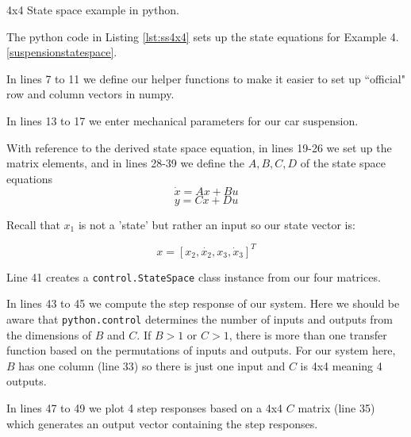 \begin{Example}
4x4 State space example in python.

The  python code in Listing \ref{lst:ss4x4} sets up the state equations for
Example  4.\ref{suspensionstatespace}.
%


In lines 7 to 11 we define our helper functions to make it easier to set up ``official"
row and column vectors in numpy.

In lines 13 to 17 we enter mechanical parameters for our car suspension.

With reference to the derived state space equation, in lines 19-26 we set
up the matrix elements, and in lines 28-39 we define the $A,B,C,D$ of the
state space equations
\[
\dot{x} = Ax+Bu
\]
\[
y = Cx + Du
\]

Recall that $x_1$ is not a 'state' but rather an input so our state vector is:

\[
x = [x_2,\dot{x_2},x_3,\dot{x}_3]^T
\]

Line 41 creates a {\tt control.StateSpace} class instance from our four matrices.

In lines 43 to 45 we compute the step response of our system.   Here we should be aware
that {\tt python.control} determines the number of inputs and outputs from the dimensions of
$B$ and $C$.   If $B>1$ or $C>1$, there is more than one transfer function based on the
permutations of inputs and outputs.   For our system here, $B$ has one column (line 33) so there
is just one input and $C$ is 4x4 meaning 4 outputs.

In lines 47 to 49 we plot 4 step responses based on a 4x4 $C$ matrix (line 35) which generates
an output vector containing the step responses.
\end{Example}
